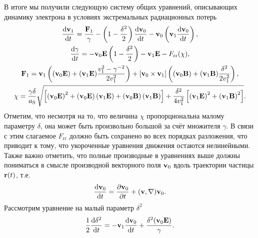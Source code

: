 В итоге мы получили следующую систему общих уравнений, описывающих динамику электрона в условиях экстремальных радиационных потерь
\begin{gather}
    \label{eq:ch1/main1}
    \dv{\vb{v}_1}{t} = \frac{\vb{F}_1}{\gamma} - \left( 1 - \frac{\delta^2}{2} \right)\dv{\vb{v}_0}{t} -\vb{v}_0\left(\vb{v}_1\dv{\vb{v}_0}{t} \right), \\
    \label{eq:ch1/main2}
    \dv{\gamma}{t} = -\vb{v}_0\vb{ E} \left( 1 - \frac{\delta^2}{2} \right) - \vb{v}_1 \vb{E} - F_\mathrm{rr}(\chi) ,                                                                       \\
    \label{eq:ch1/f1}
    \vb{F}_1 = \vb{v}_1 \left( (\vb{v}_0 \vb{E}) + (\vb{v}_1 \vb{E})\frac{v_1^2 - \gamma^{-2} }{2v_1^2} \right)
    + [\vb{v}_0\times\vb{v}_1] \left( (\vb{v}_0 \vb{B}) + (\vb{v}_1 \vb{B}) \frac{\delta^2}{2v_1^2}\right) , \\
    \label{eq:ch1/base_chi}
    \chi = \frac{\gamma \delta}{a_\mathrm{S}}\sqrt{\left[ \left( \vb{v}_0 \vb{E} \right)^2 + \left( \vb{v}_0\vb{E} \right)\left( \vb{v}_1\vb{E} \right) + \left( \vb{v}_0\vb{B} \right)\left( \vb{v}_1\vb{B} \right) \right] + \frac{\delta^2}{4v_1^2}\left[ \left( \vb{v}_1 \vb{E} \right)^2 + \left( \vb{v}_1 \vb{B} \right)^2 \right]}.
\end{gather}
Отметим, что несмотря на то, что величина $\chi$ пропорциональна малому параметру $\delta$, она может быть произвольно большой за счёт множителя $\gamma$.
В связи с этим слагаемое $F_\mathrm{rr}$ должно быть сохранено во всех порядках разложения, что приводит к тому, что укороченные уравнения движения остаются нелинейными.
Также важно отметить, что полные производные в уравнениях выше должны пониматься в смысле производной векторного поля $\vb{v}_0$ вдоль траектории частицы $\vb{r}(t)$, т.е.
\begin{equation}
    \dv{\vb{v}_0}{t} = \pdv{\vb{v}_0}{t} + (\vb{v},\nabla)\vb{v}_0 .
\end{equation}
Рассмотрим уравнение на малый параметр $\delta^2$
\begin{equation}
    \label{eq:ch1/dv2dt}
    \frac{1}{2}\dv{\delta^2}{t} = - \vb{v}_1\dv{\vb{v}_0}{t} + \frac{\delta^2(\vb{v}_0 \vb{E})}{\gamma}.
\end{equation}
